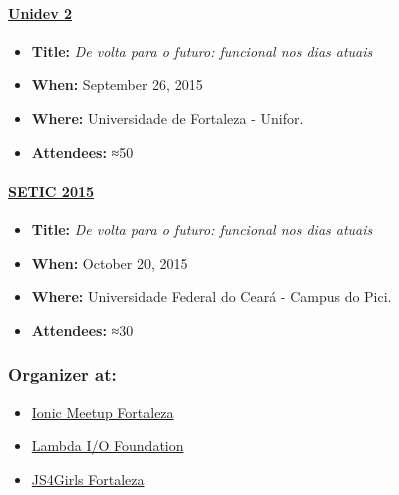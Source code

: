 \documentclass[]{article}
\providecommand{\tightlist}{%
  \setlength{\itemsep}{0pt}\setlength{\parskip}{0pt}}
\let\oldparagraph\paragraph
\renewcommand{\paragraph}[1]{\oldparagraph{#1}\mbox{}}
\begin{document}
\paragraph{\texorpdfstring{\href{http://unidevce.github.io/}{Unidev
2}}{Unidev 2}}\label{unidev-2}

\begin{itemize}
\tightlist
\item
  \textbf{Title:} \emph{De volta para o futuro: funcional nos dias
  atuais}
\item
  \textbf{When:} September 26, 2015
\item
  \textbf{Where:} Universidade de Fortaleza - Unifor.
\item
  \textbf{Attendees:} ≈50
\end{itemize}

\paragraph{\texorpdfstring{\href{http://www.seti.ufc.br/}{SETIC
2015}}{SETIC 2015}}\label{setic-2015}

\begin{itemize}
\tightlist
\item
  \textbf{Title:} \emph{De volta para o futuro: funcional nos dias
  atuais}
\item
  \textbf{When:} October 20, 2015
\item
  \textbf{Where:} Universidade Federal do Ceará - Campus do Pici.
\item
  \textbf{Attendees:} ≈30
\end{itemize}

\subsubsection{Organizer at:}\label{organizer-at}

\begin{itemize}
\tightlist
\item
  \href{http://ionicbrazil.com/}{Ionic Meetup Fortaleza}
\item
  \href{https://github.com/lambda-io}{Lambda I/O Foundation}
\item
  \href{http://js4girls-fortaleza.github.io/}{JS4Girls Fortaleza}
\end{itemize}
\end{document}
